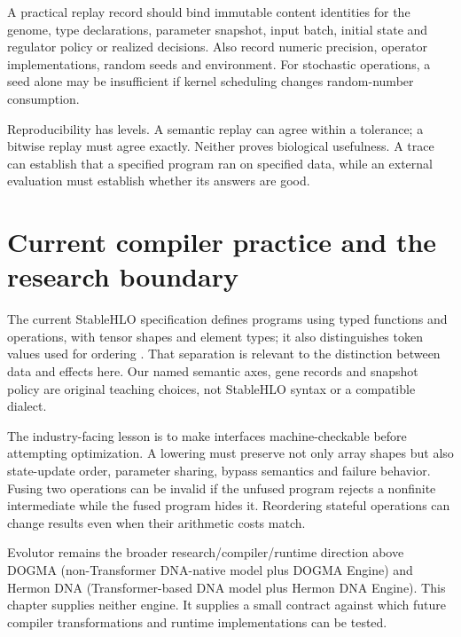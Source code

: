 
A practical replay record should bind immutable content identities for
the genome, type declarations, parameter snapshot, input batch, initial
state and regulator policy or realized decisions. Also record numeric
precision, operator implementations, random seeds and environment.
For stochastic operations, a seed alone may be insufficient if kernel
scheduling changes random-number consumption.

Reproducibility has levels. A semantic replay can agree within a tolerance;
a bitwise replay must agree exactly. Neither proves biological usefulness.
A trace can establish that a specified program ran on specified data, while
an external evaluation must establish whether its answers are good.

\section{Current compiler practice and the research boundary}
The current StableHLO specification defines programs using typed functions
and operations, with tensor shapes and element types; it also distinguishes
token values used for ordering \cite{stablehlo}. That separation is relevant
to the distinction between data and effects here. Our named semantic axes,
gene records and snapshot policy are original teaching choices, not
StableHLO syntax or a compatible dialect.

The industry-facing lesson is to make interfaces machine-checkable before
attempting optimization. A lowering must preserve not only array shapes but
also state-update order, parameter sharing, bypass semantics and failure
behavior. Fusing two operations can be invalid if the unfused program rejects
a nonfinite intermediate while the fused program hides it. Reordering
stateful operations can change results even when their arithmetic costs match.

Evolutor remains the broader research/compiler/runtime direction above
DOGMA (non-Transformer DNA-native model plus DOGMA Engine) and Hermon DNA
(Transformer-based DNA model plus Hermon DNA Engine). This chapter supplies
neither engine. It supplies a small contract against which future compiler
transformations and runtime implementations can be tested.


